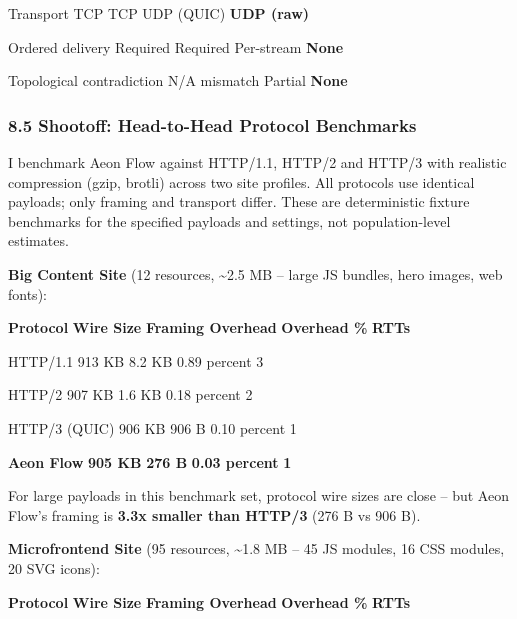 \documentclass[
]{article}
\begin{document}
Transport \textbar{} TCP \textbar{} TCP \textbar{} UDP (QUIC) \textbar{}
\textbf{UDP (raw)} \textbar{}

Ordered delivery \textbar{} Required \textbar{} Required \textbar{}
Per-stream \textbar{} \textbf{None} \textbar{}

Topological contradiction \textbar{} N/A \textbar{} mismatch \textbar{}
Partial \textbar{} \textbf{None} \textbar{}

\subsubsection{\texorpdfstring{\textbf{8.5 Shootoff: Head-to-Head
Protocol
Benchmarks}}{8.5 Shootoff: Head-to-Head Protocol Benchmarks}}\label{shootoff-head-to-head-protocol-benchmarks}

I benchmark Aeon Flow against HTTP/1.1, HTTP/2 and HTTP/3 with realistic
compression (gzip, brotli) across two site profiles. All protocols use
identical payloads; only framing and transport differ. These are
deterministic fixture benchmarks for the specified payloads and
settings, not population-level estimates.

\textbf{Big Content Site} (12 resources, \textasciitilde2.5 MB -- large
JS bundles, hero images, web fonts):

\textbf{Protocol} \textbar{} \textbf{Wire Size} \textbar{}
\textbf{Framing Overhead} \textbar{} \textbf{Overhead \%} \textbar{}
\textbf{RTTs} \textbar{}

HTTP/1.1 \textbar{} 913 KB \textbar{} 8.2 KB \textbar{} 0.89 percent
\textbar{} 3 \textbar{}

HTTP/2 \textbar{} 907 KB \textbar{} 1.6 KB \textbar{} 0.18 percent
\textbar{} 2 \textbar{}

HTTP/3 (QUIC) \textbar{} 906 KB \textbar{} 906 B \textbar{} 0.10 percent
\textbar{} 1 \textbar{}

\textbf{Aeon Flow} \textbar{} \textbf{905 KB} \textbar{} \textbf{276 B}
\textbar{} \textbf{0.03 percent} \textbar{} \textbf{1} \textbar{}

For large payloads in this benchmark set, protocol wire sizes are close
-- but Aeon Flow's framing is \textbf{3.3x smaller than HTTP/3} (276 B
vs 906 B).

\textbf{Microfrontend Site} (95 resources, \textasciitilde1.8 MB -- 45
JS modules, 16 CSS modules, 20 SVG icons):

\textbf{Protocol} \textbar{} \textbf{Wire Size} \textbar{}
\textbf{Framing Overhead} \textbar{} \textbf{Overhead \%} \textbar{}
\textbf{RTTs} \textbar{}
\end{document}
